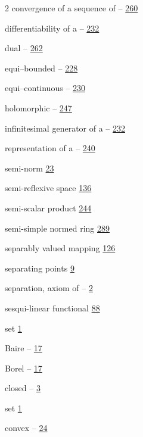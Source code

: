 \begin{multicols}{2}
\hspace*{1.1em}convergence of a sequence of -- \hyperlink{page.260}{260}\par
\hspace*{1.1em}differentiability of a -- \hyperlink{page.232}{232}\par
\hspace*{1.1em}dual -- \hyperlink{page.262}{262}\par
\hspace*{1.1em}equi--bounded -- \hyperlink{page.228}{228}\par
\hspace*{1.1em}equi--continuous -- \hyperlink{page.230}{230}\par
\hspace*{1.1em}holomorphic -- \hyperlink{page.247}{247}\par
\hspace*{1.1em}infinitesimal generator of a -- \hyperlink{page.232}{232}\par
\hspace*{1.1em}representation of a -- \hyperlink{page.240}{240}\par
\noindent semi-norm \hyperlink{page.23}{23}\par
\noindent semi-reflexive space \hyperlink{page.136}{136}\par
\noindent semi-scalar product \hyperlink{page.244}{244}\par
\noindent semi-simple normed ring \hyperlink{page.289}{289}\par
\noindent separably valued mapping \hyperlink{page.126}{126}\par
\noindent separating points \hyperlink{page.9}{9}\par
\noindent separation, axiom of -- \hyperlink{page.2}{2}\par
\noindent sesqui-linear functional \hyperlink{page.88}{88}\par
\noindent set \hyperlink{page.1}{1}\par
\hspace*{1.1em}Baire -- \hyperlink{page.17}{17}\par
\hspace*{1.1em}Borel -- \hyperlink{page.17}{17}\par
\hspace*{1.1em}closed -- \hyperlink{page.3}{3}\par
\noindent set \hyperlink{page.1}{1}\par
\hspace*{1.1em}convex -- \hyperlink{page.24}{24}\par

\end{multicols}
